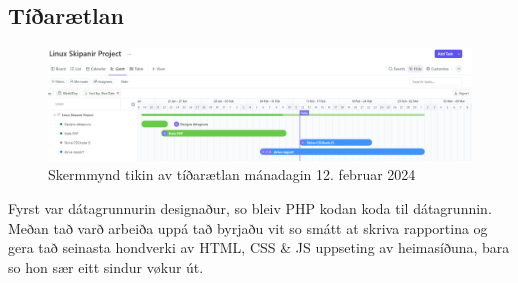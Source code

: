 \documentclass{article}
\begin{document}
\subsection{Tíðarætlan}
\begin{figure}[H]
    \includegraphics[width=\linewidth]{tíðarætlan.png}
    \caption{Skermmynd tikin av tíðarætlan mánadagin 12. februar 2024}
    \label{fig:tíðarætlan.png}
\end{figure}

\par Fyrst var dátagrunnurin designaður, so bleiv PHP kodan koda til dátagrunnin.
Meðan tað varð arbeiða uppá tað byrjaðu vit so smátt at skriva rapportina og gera tað
seinasta hondverki av HTML, CSS \& JS uppseting av heimasíðuna, bara so hon sær eitt sindur
vøkur út.


{}


{}


{}


{}


{}


{}


{}


{}


{}


{}

\end{document}
